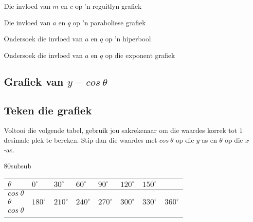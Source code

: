 \begin{Ondersoek}{Die invloed van $m$ en $c$ op 'n reguitlyn grafiek}
\begin{Ondersoek}{Die invloed van $a$ en $q$ op 'n paraboliese grafiek}
\begin{Ondersoek}{Ondersoek die invloed van $a$ en $q$ op 'n hiperbool}
\begin{Ondersoek}{Ondersoek die invloed van $a$ en $q$ op die exponent grafiek}
\subsection{Grafiek van $y=cos~\theta $}
\subsection*{Teken die grafiek}
\nopagebreak
 Voltooi die volgende tabel, gebruik jou sakrekenaar om die waardes korrek tot $1$ desimale plek te bereken. Stip
dan die waardes met $cos~\theta $ op die $y$-as en $\theta $ op die $x$-as.\par 

\setlength\mytablespace{16\tabcolsep}
\addtolength\mytablespace{9\arrayrulewidth}
\setlength\mytablewidth{\linewidth}
\setlength\mytableroom{\mytablewidth}
\addtolength\mytableroom{-\mytablespace}
\setlength\myfixedwidth{0pt}
\setlength\mystarwidth{\mytableroom}
\addtolength\mystarwidth{-\myfixedwidth}
\divide\mystarwidth 80subsub
\begin{center}
\label{m39414*id86399}
\noindent

\begin{tabular*}{\mytablewidth}{|p{10\mystarwidth}|p{10\mystarwidth}|p{10\mystarwidth}|p{10\mystarwidth}|p{10\mystarwidth}|p{10\mystarwidth}|p{10\mystarwidth}|p{10\mystarwidth}|}\hline
$\theta $     &
$0^{\circ }$ &
$30^{\circ }$ &
$60^{\circ }$ &
$90^{\circ }$ &
$120^{\circ }$ &
$150^{\circ }$ &
\\ \hline

$cos~\theta $  &
&
&
&
&
&
&
\\ \hline

$\theta $    &
$180^{\circ }$ &
$210^{\circ }$ &
$240^{\circ }$ &
$270^{\circ }$ &
$300^{\circ }$ &
$330^{\circ }$ &
$360^{\circ }$

\\ \hline

$cos~\theta $&
&
&
&
&
&
&

\\ \hline

\multicolumn{8}{|p{\dimexpr10\mystarwidth+10\mystarwidth+10\mystarwidth+10\mystarwidth+10\mystarwidth+10\mystarwidth+10\mystarwidth+10\mystarwidth+14\tabcolsep+7\arrayrulewidth\relax}|}{}

\\ \hline


\end{tabular*}
\end{center}
\end{Ondersoek}
\end{Ondersoek}
\end{Ondersoek}
\end{Ondersoek}
